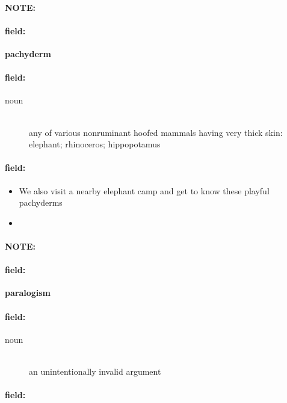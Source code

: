 \documentclass[12pt]{article}
\newenvironment{note}{\paragraph{NOTE:}}{}
\newenvironment{field}{\paragraph{field:}}{}
\begin{document}
\begin{note}
\begin{field}
\textbf{\large pachyderm}
\end{field}


\begin{field}
\begin{description}
\item[noun] \hfill \\ 
any of various nonruminant hoofed mammals having very thick skin: elephant; rhinoceros; hippopotamus

\end{description}
\end{field}

\begin{field}
\begin{itemize}
\item We also visit a nearby elephant camp and get to know these playful pachyderms
\item 
\end{itemize}
\end{field}
\end{note}
\begin{note}
\begin{field}
\textbf{\large paralogism}
\end{field}


\begin{field}
\begin{description}
\item[noun] \hfill \\ 
an unintentionally invalid argument

\end{description}
\end{field}

\begin{field}
\end{field}
\end{note}
\end{document}
